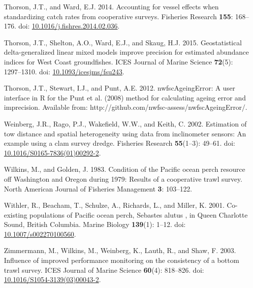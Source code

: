 \documentclass[12pt,]{article}
\begin{document}
\hypertarget{ref-thorson_accounting_2014}{}
Thorson, J.T., and Ward, E.J. 2014. Accounting for vessel effects when
standardizing catch rates from cooperative surveys. Fisheries Research
\textbf{155}: 168--176. doi:
\href{https://doi.org/10.1016/j.fishres.2014.02.036}{10.1016/j.fishres.2014.02.036}.

\hypertarget{ref-thorson_geostatistical_2015}{}
Thorson, J.T., Shelton, A.O., Ward, E.J., and Skaug, H.J. 2015.
Geostatistical delta-generalized linear mixed models improve precision
for estimated abundance indices for West Coast groundfishes. ICES
Journal of Marine Science \textbf{72}(5): 1297--1310. doi:
\href{https://doi.org/10.1093/icesjms/fsu243}{10.1093/icesjms/fsu243}.

\hypertarget{ref-thorson_nwfscageingerror:_2012}{}
Thorson, J.T., Stewart, I.J., and Punt, A.E. 2012. nwfscAgeingError: A
user interface in R for the Punt et al. (2008) method for calculating
ageing error and imprecision. Available from:
http://github.com/nwfsc-assess/nwfscAgeingError/.

\hypertarget{ref-weinberg_estimation_2002}{}
Weinberg, J.R., Rago, P.J., Wakefield, W.W., and Keith, C. 2002.
Estimation of tow distance and spatial heterogeneity using data from
inclinometer sensors: An example using a clam survey dredge. Fisheries
Research \textbf{55}(1--3): 49--61. doi:
\href{https://doi.org/10.1016/S0165-7836(01)00292-2}{10.1016/S0165-7836(01)00292-2}.

\hypertarget{ref-wilkins_condition_1983}{}
Wilkins, M., and Golden, J. 1983. Condition of the Pacific ocean perch
resource off Washington and Oregon during 1979: Results of a cooperative
trawl survey. North American Journal of Fisheries Management \textbf{3}:
103--122.

\hypertarget{ref-withler_co-existing_2001}{}
Withler, R., Beacham, T., Schulze, A., Richards, L., and Miller, K.
2001. Co-existing populations of Pacific ocean perch, Sebastes alutus ,
in Queen Charlotte Sound, British Columbia. Marine Biology
\textbf{139}(1): 1--12. doi:
\href{https://doi.org/10.1007/s002270100560}{10.1007/s002270100560}.

\hypertarget{ref-zimmermann_influence_2003}{}
Zimmermann, M., Wilkins, M., Weinberg, K., Lauth, R., and Shaw, F. 2003.
Influence of improved performance monitoring on the consistency of a
bottom trawl survey. ICES Journal of Marine Science \textbf{60}(4):
818--826. doi:
\href{https://doi.org/10.1016/S1054-3139(03)00043-2}{10.1016/S1054-3139(03)00043-2}.
\end{document}
